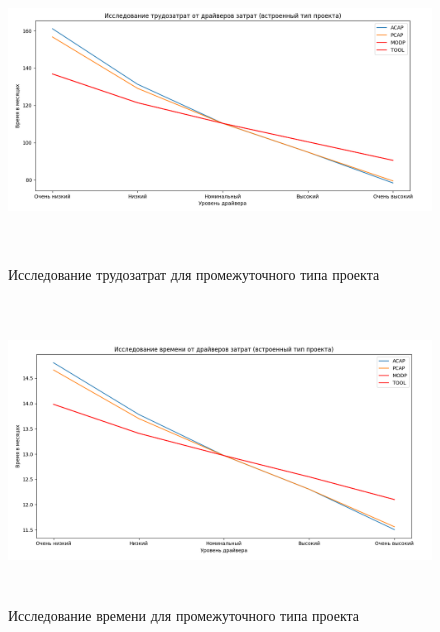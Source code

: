 \FloatBarrier
\begin{figure}[h]	
	\begin{center}
		\includegraphics[width=\linewidth, height=8cm]{inc/workeasy.png}
	\end{center}
	\captionsetup{justification=centering}
	\caption{Исследование трудозатрат для промежуточного типа проекта}
\end{figure}
\FloatBarrier 

\FloatBarrier
\begin{figure}[h]	
	\begin{center}
		\includegraphics[width=\linewidth, height=8cm]{inc/timeeasy.png}
	\end{center}
	\captionsetup{justification=centering}
	\caption{Исследование времени для промежуточного типа проекта}
\end{figure}
\FloatBarrier 

